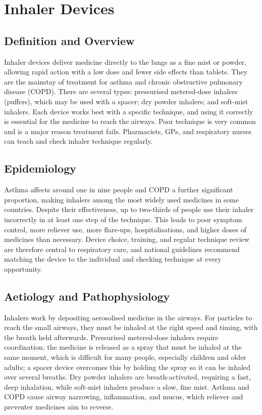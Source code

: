 \chapter{Inhaler Devices}

\section*{Definition and Overview}
Inhaler devices deliver medicine directly to the lungs as a fine mist or powder, allowing rapid action with a low dose and fewer side effects than tablets. They are the mainstay of treatment for asthma and chronic obstructive pulmonary disease (COPD). There are several types: pressurised metered-dose inhalers (puffers), which may be used with a spacer; dry powder inhalers; and soft-mist inhalers. Each device works best with a specific technique, and using it correctly is essential for the medicine to reach the airways. Poor technique is very common and is a major reason treatment fails. Pharmacists, GPs, and respiratory nurses can teach and check inhaler technique regularly.

\section*{Epidemiology}
Asthma affects around one in nine people and COPD a further significant proportion, making inhalers among the most widely used medicines in some countries. Despite their effectiveness, up to two-thirds of people use their inhaler incorrectly in at least one step of the technique. This leads to poor symptom control, more reliever use, more flare-ups, hospitalisations, and higher doses of medicines than necessary. Device choice, training, and regular technique review are therefore central to respiratory care, and national guidelines recommend matching the device to the individual and checking technique at every opportunity.

\section*{Aetiology and Pathophysiology}
Inhalers work by depositing aerosolised medicine in the airways. For particles to reach the small airways, they must be inhaled at the right speed and timing, with the breath held afterwards. Pressurised metered-dose inhalers require coordination: the medicine is released as a spray that must be inhaled at the same moment, which is difficult for many people, especially children and older adults; a spacer device overcomes this by holding the spray so it can be inhaled over several breaths. Dry powder inhalers are breath-activated, requiring a fast, deep inhalation, while soft-mist inhalers produce a slow, fine mist. Asthma and COPD cause airway narrowing, inflammation, and mucus, which reliever and preventer medicines aim to reverse.

